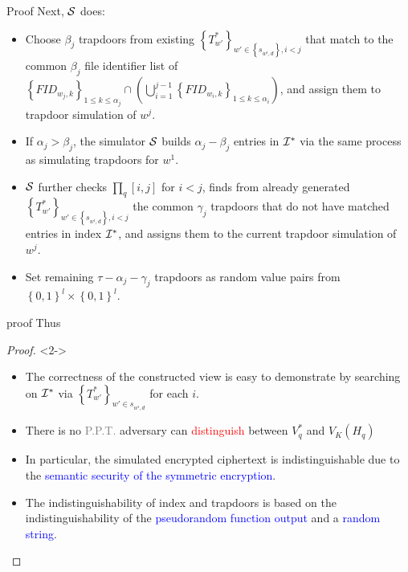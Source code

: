 \documentclass[handout]{beamer}
\begin{document}
\begin{frame}{Proof}
	Next, $\cal S$ does:
	\begin{itemize}
		\item<2-> Choose ${\beta _j}$ trapdoors from existing ${\left\{ {T_{w'}^*} \right\}_{w' \in \left\{ {{s_{{w^i},d}}} \right\},i < j}}$ that match to the common ${\beta _j}$ file identifier list of ${\left\{ {FI{D_{{w_j},k}}} \right\}_{1 \le k \le {\alpha _j}}} \cap (\bigcup\nolimits_{i = 1}^{j - 1} {{{\left\{ {FI{D_{{w_i},k}}} \right\}}_{1 \le k \le {\alpha _i}}}} )$, and assign them to trapdoor simulation of $w^j$.
		\item<3-> If $\alpha_j > \beta_j$, the simulator $\cal S$ builds $\alpha_j - \beta_j$ entries in ${{{\cal I}^*}}$ via the same process as simulating trapdoors for $w^1$.
		\item<4-> $\cal S$ further checks ${{\prod _q}[i,j]}$ for $i < j$, finds from already generated ${\left\{ {T_{w'}^*} \right\}_{w' \in \left\{ {{s_{{w^i},d}}} \right\},i < j}}$ the common ${\gamma _j}$ trapdoors that do not have matched entries in index ${{{\cal I}^*}}$, and assigns them to the current trapdoor simulation of $w^j$.
		\item<5-> Set remaining $\tau  - {\alpha _j} - {\gamma _j}$ trapdoors as random value pairs from ${\left\{ {0,1} \right\}^l} \times {\left\{ {0,1} \right\}^l}$.
 \end{itemize}
\end{frame}

\begin{frame}{proof}
	Thus
	\begin{proof}<2->
		\begin{itemize}
			\item<3-> The correctness of the constructed view is easy to demonstrate by searching on ${{{\cal I}^*}}$ via ${\left\{ {T_{w'}^*} \right\}_{w' \in {s_{{w^i},d}}}}$ for each $i$.
			\item<4-> There is no \textcolor{grey}{P.P.T.} adversary can \textcolor{red}{distinguish} between $V_q^*$ and ${V_K}({H_q})$
			\item<5-> In particular, the simulated encrypted ciphertext
			is indistinguishable due to the \textcolor{blue}{semantic security of the
			symmetric encryption}.
			\item<6-> The indistinguishability of index and trapdoors is based on the indistinguishability of the \textcolor{blue}{pseudorandom function output} and a \textcolor{blue}{random string}.
		\end{itemize}
	\end{proof}
\end{frame}
\end{document}
